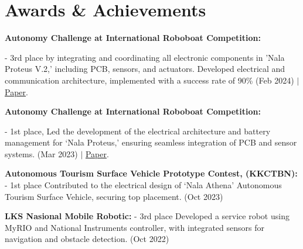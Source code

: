 \documentclass[letterpaper,11pt]{article}
\newcommand{\resumeSubHeadingListStart}{\begin{itemize}[leftmargin=0.15in, label={}]}
\newcommand{\resumeSubHeadingListEnd}{\end{itemize}}
\begin{document}
\section{Awards \& Achievements}
  \vspace{2pt}
  \resumeSubHeadingListStart
    \small{\item{
        \textbf{Autonomy Challenge at International Roboboat Competition:}{ - 3rd place by integrating and coordinating all electronic components in 'Nala Proteus V.2,' including PCB, sensors, and actuators. Developed electrical and communication architecture, implemented with a success rate of 90\% {(Feb 2024) $|$ \href{https://robonation.org/app/uploads/sites/3/2023/02/TDR_Institut-Teknologi-Sepuluh-Nopember_RB2023.pdf}{\color{blue}Paper}.} \\ \vspace{3pt}
        
        \textbf{Autonomy Challenge at International Roboboat Competition:}{ - 1st place, Led the development of the electrical architecture and battery management for ‘Nala Proteus,’ ensuring seamless integration of PCB and sensor systems. {(Mar 2023) $|$ \href{https://robonation.org/app/uploads/sites/3/2023/12/TDR_ITS-Barunastra_RB2024.pdf}{\color{blue}Paper}.} \\ \vspace{3pt}
        
        \textbf{Autonomous Tourism Surface Vehicle Prototype Contest, (KKCTBN):}{ - 1st place Contributed to the electrical design of ‘Nala Athena’ Autonomous Tourism Surface Vehicle, securing top placement. (Oct 2023)} \\ \vspace{3pt}
        
        \textbf{LKS Nasional Mobile Robotic:}{ - 3rd place Developed a service robot using MyRIO and National Instruments controller, with integrated sensors for navigation and obstacle detection. (Oct 2022)} \\ \vspace{3pt}
        
    }}}}
\resumeSubHeadingListEnd



\end{document}
